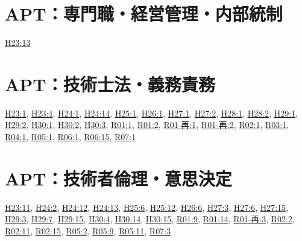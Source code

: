 \section{APT：専門職・経営管理・内部統制}
\hyperref[q:h23-reg-apt-13]{H23:13}
\section{APT：技術士法・義務責務}
\hyperref[q:h23-reg-apt-01]{H23:1}, \hyperref[q:h23-reg-apt-04]{H23:4}, \hyperref[q:h24-reg-apt-01]{H24:1}, \hyperref[q:h24-reg-apt-14]{H24:14}, \hyperref[q:h25-reg-apt-01]{H25:1}, \hyperref[q:h26-reg-apt-01]{H26:1}, \hyperref[q:h27-reg-apt-01]{H27:1}, \hyperref[q:h27-reg-apt-02]{H27:2}, \hyperref[q:h28-reg-apt-01]{H28:1}, \hyperref[q:h28-reg-apt-02]{H28:2}, \hyperref[q:h29-reg-apt-01]{H29:1}, \hyperref[q:h29-reg-apt-02]{H29:2}, \hyperref[q:h30-reg-apt-01]{H30:1}, \hyperref[q:h30-reg-apt-02]{H30:2}, \hyperref[q:h30-reg-apt-03]{H30:3}, \hyperref[q:r01-reg-apt-01]{R01:1}, \hyperref[q:r01-reg-apt-02]{R01:2}, \hyperref[q:r01-ret-apt-01]{R01-再:1}, \hyperref[q:r01-ret-apt-02]{R01-再:2}, \hyperref[q:r02-reg-apt-01]{R02:1}, \hyperref[q:r03-reg-apt-01]{R03:1}, \hyperref[q:r04-reg-apt-01]{R04:1}, \hyperref[q:r05-reg-apt-01]{R05:1}, \hyperref[q:r06-reg-apt-01]{R06:1}, \hyperref[q:r06-reg-apt-15]{R06:15}, \hyperref[q:r07-reg-apt-01]{R07:1}
\section{APT：技術者倫理・意思決定}
\hyperref[q:h23-reg-apt-11]{H23:11}, \hyperref[q:h24-reg-apt-02]{H24:2}, \hyperref[q:h24-reg-apt-12]{H24:12}, \hyperref[q:h24-reg-apt-13]{H24:13}, \hyperref[q:h25-reg-apt-06]{H25:6}, \hyperref[q:h25-reg-apt-12]{H25:12}, \hyperref[q:h26-reg-apt-06]{H26:6}, \hyperref[q:h27-reg-apt-03]{H27:3}, \hyperref[q:h27-reg-apt-06]{H27:6}, \hyperref[q:h27-reg-apt-15]{H27:15}, \hyperref[q:h29-reg-apt-03]{H29:3}, \hyperref[q:h29-reg-apt-07]{H29:7}, \hyperref[q:h29-reg-apt-15]{H29:15}, \hyperref[q:h30-reg-apt-04]{H30:4}, \hyperref[q:h30-reg-apt-14]{H30:14}, \hyperref[q:h30-reg-apt-15]{H30:15}, \hyperref[q:r01-reg-apt-09]{R01:9}, \hyperref[q:r01-reg-apt-14]{R01:14}, \hyperref[q:r01-ret-apt-03]{R01-再:3}, \hyperref[q:r02-reg-apt-02]{R02:2}, \hyperref[q:r02-reg-apt-11]{R02:11}, \hyperref[q:r02-reg-apt-15]{R02:15}, \hyperref[q:r05-reg-apt-02]{R05:2}, \hyperref[q:r05-reg-apt-09]{R05:9}, \hyperref[q:r05-reg-apt-11]{R05:11}, \hyperref[q:r07-reg-apt-03]{R07:3}
